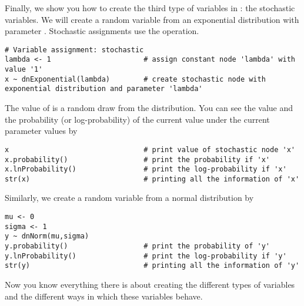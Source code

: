 Finally, we show you how to create the third type of variables in \Rev: the stochastic variables. 
We will create a random variable  from an exponential distribution with parameter .  
Stochastic assignments use the \cl{\rbdn} operation.
{\tt \begin{snugshade*}
\begin{lstlisting}     
# Variable assignment: stochastic
lambda <- 1                      # assign constant node 'lambda' with value '1'
x ~ dnExponential(lambda)        # create stochastic node with exponential distribution and parameter 'lambda'
\end{lstlisting}
\end{snugshade*}}
The value of  is a random draw from the distribution. 
You can see the value and the probability (or log-probability) of the current value under the current parameter values by
{\tt \begin{snugshade*}
\begin{lstlisting}    
x                                # print value of stochastic node 'x'
x.probability()                  # print the probability if 'x'
x.lnProbability()                # print the log-probability if 'x'
str(x)                           # printing all the information of 'x'
\end{lstlisting}
\end{snugshade*}}
Similarly, we create a random variable  from a normal distribution by
{\tt \begin{snugshade*}
\begin{lstlisting}    
mu <- 0
sigma <- 1
y ~ dnNorm(mu,sigma)	
y.probability()                  # print the probability of 'y'
y.lnProbability()                # print the log-probability if 'y'
str(y)                           # printing all the information of 'y'
\end{lstlisting}
\end{snugshade*}}
Now you know everything there is about creating the different types of variables and the different ways in which these variables behave.




